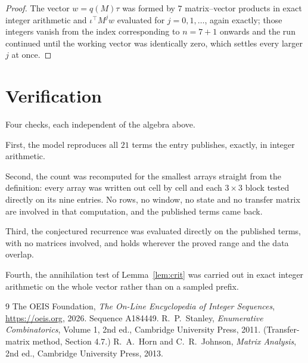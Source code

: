\documentclass[11pt,a4paper]{article}
\theoremstyle{plain}
\theoremstyle{definition}
\begin{document}
\begin{proof}
The vector $w=q(M)\tau$ was formed by $7$ matrix--vector products in exact integer
arithmetic and $\iota^{\!\top}M^{j}w$ evaluated for $j=0,1,\dots$, again exactly; those
integers vanish from the index corresponding to $n=7+1$ onwards and the run continued
until the working vector was identically zero, which settles every larger $j$ at once.
\end{proof}

\section{Verification}

Four checks, each independent of the algebra above.

First, the model reproduces all $21$ terms the entry publishes, exactly, in integer
arithmetic.

Second, the count was recomputed for the smallest arrays straight from the definition: every
array was written out cell by cell and each $3\times3$ block tested directly on its nine
entries. No rows, no window, no state and no transfer matrix are involved in that computation,
and the published terms came back.

Third, the conjectured recurrence was evaluated directly on the published terms, with no
matrices involved, and holds wherever the proved range and the data overlap.

Fourth, the annihilation test of Lemma~\ref{lem:crit} was carried out in exact integer
arithmetic on the whole vector rather than on a sampled prefix.

\begin{thebibliography}{9}
 The OEIS Foundation, \emph{The On-Line Encyclopedia of Integer
Sequences}, \url{https://oeis.org}, 2026. Sequence A184449.
 R.~P.~Stanley, \emph{Enumerative Combinatorics}, Volume 1, 2nd ed.,
Cambridge University Press, 2011. (Transfer-matrix method, Section 4.7.)
 R.~A.~Horn and C.~R.~Johnson, \emph{Matrix Analysis}, 2nd ed., Cambridge
University Press, 2013.
\end{thebibliography}
\end{document}
